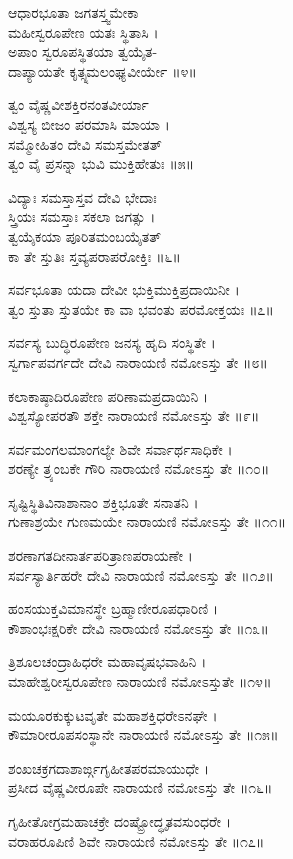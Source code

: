 ಆಧಾರಭೂತಾ ಜಗತಸ್ತ್ವಮೇಕಾ\\
        ಮಹೀಸ್ವರೂಪೇಣ ಯತಃ ಸ್ಥಿತಾಸಿ ।\\
ಅಪಾಂ ಸ್ವರೂಪಸ್ಥಿತಯಾ ತ್ವಯೈತ-\\
      ದಾಪ್ಯಾಯತೇ ಕೃತ್ಸ್ನಮಲಂಘ್ಯವೀರ್ಯೇ ॥೪॥

ತ್ವಂ ವೈಷ್ಣವೀಶಕ್ತಿರನಂತವೀರ್ಯಾ\\
      ವಿಶ್ವಸ್ಯ ಬೀಜಂ ಪರಮಾಸಿ ಮಾಯಾ ।\\
ಸಮ್ಮೋಹಿತಂ ದೇವಿ ಸಮಸ್ತಮೇತತ್\\
      ತ್ವಂ ವೈ ಪ್ರಸನ್ನಾ ಭುವಿ ಮುಕ್ತಿಹೇತುಃ ॥೫॥

ವಿದ್ಯಾಃ ಸಮಸ್ತಾಸ್ತವ ದೇವಿ ಭೇದಾಃ\\
        ಸ್ತ್ರಿಯಃ ಸಮಸ್ತಾಃ ಸಕಲಾ ಜಗತ್ಸು ।\\
ತ್ವಯೈಕಯಾ ಪೂರಿತಮಂಬಯೈತತ್\\
        ಕಾ ತೇ ಸ್ತುತಿಃ ಸ್ತವ್ಯಪರಾಪರೋಕ್ತಿಃ ॥೬॥

ಸರ್ವಭೂತಾ ಯದಾ ದೇವೀ ಭುಕ್ತಿಮುಕ್ತಿಪ್ರದಾಯಿನೀ ।\\
ತ್ವಂ ಸ್ತುತಾ ಸ್ತುತಯೇ ಕಾ ವಾ ಭವಂತು ಪರಮೋಕ್ತಯಃ ॥೭॥

ಸರ್ವಸ್ಯ ಬುದ್ಧಿರೂಪೇಣ ಜನಸ್ಯ ಹೃದಿ ಸಂಸ್ಥಿತೇ ।\\
ಸ್ವರ್ಗಾಪವರ್ಗದೇ ದೇವಿ ನಾರಾಯಣಿ ನಮೋಽಸ್ತು ತೇ ॥೮॥

ಕಲಾಕಾಷ್ಠಾದಿರೂಪೇಣ ಪರಿಣಾಮಪ್ರದಾಯಿನಿ ।\\
ವಿಶ್ವಸ್ಯೋಪರತೌ ಶಕ್ತೇ ನಾರಾಯಣಿ ನಮೋಽಸ್ತು ತೇ ॥೯॥

ಸರ್ವಮಂಗಲಮಾಂಗಲ್ಯೇ ಶಿವೇ ಸರ್ವಾರ್ಥಸಾಧಿಕೇ ।\\
ಶರಣ್ಯೇ ತ್ರ್ಯಂಬಕೇ ಗೌರಿ ನಾರಾಯಣಿ ನಮೋಽಸ್ತು ತೇ ॥೧೦॥

ಸೃಷ್ಟಿಸ್ಥಿತಿವಿನಾಶಾನಾಂ ಶಕ್ತಿಭೂತೇ ಸನಾತನಿ ।\\
ಗುಣಾಶ್ರಯೇ ಗುಣಮಯೇ ನಾರಾಯಣಿ ನಮೋಽಸ್ತು ತೇ ॥೧೧॥

ಶರಣಾಗತದೀನಾರ್ತಪರಿತ್ರಾಣಪರಾಯಣೇ ।\\
ಸರ್ವಸ್ಯಾರ್ತಿಹರೇ ದೇವಿ ನಾರಾಯಣಿ ನಮೋಽಸ್ತು ತೇ ॥೧೨॥

ಹಂಸಯುಕ್ತವಿಮಾನಸ್ಥೇ ಬ್ರಹ್ಮಾಣೀರೂಪಧಾರಿಣಿ ।\\
ಕೌಶಾಂಭಃಕ್ಷರಿಕೇ ದೇವಿ ನಾರಾಯಣಿ ನಮೋಽಸ್ತು ತೇ ॥೧೩॥

ತ್ರಿಶೂಲಚಂದ್ರಾಹಿಧರೇ ಮಹಾವೃಷಭವಾಹಿನಿ ।\\
ಮಾಹೇಶ್ವರೀಸ್ವರೂಪೇಣ ನಾರಾಯಣಿ ನಮೋಽಸ್ತುತೇ ॥೧೪॥

ಮಯೂರಕುಕ್ಕುಟವೃತೇ ಮಹಾಶಕ್ತಿಧರೇಽನಘೇ ।\\
ಕೌಮಾರೀರೂಪಸಂಸ್ಥಾನೇ ನಾರಾಯಣಿ ನಮೋಽಸ್ತು ತೇ ॥೧೫॥

ಶಂಖಚಕ್ರಗದಾಶಾರ್ಙ್ಗಗೃಹೀತಪರಮಾಯುಧೇ ।\\
ಪ್ರಸೀದ ವೈಷ್ಣವೀರೂಪೇ ನಾರಾಯಣಿ ನಮೋಽಸ್ತು ತೇ ॥೧೬॥

ಗೃಹೀತೋಗ್ರಮಹಾಚಕ್ರೇ ದಂಷ್ಟ್ರೋದ್ಧೃತವಸುಂಧರೇ ।\\
ವರಾಹರೂಪಿಣಿ ಶಿವೇ ನಾರಾಯಣಿ ನಮೋಽಸ್ತು ತೇ ॥೧೭॥

